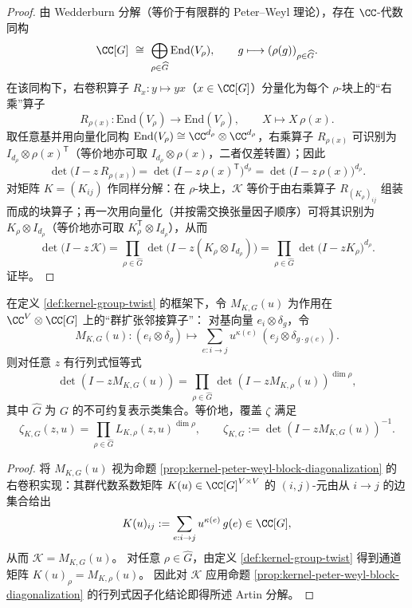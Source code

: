 \begin{proof}
由 Wedderburn 分解（等价于有限群的 Peter--Weyl 理论），存在 \(\CC\)-代数同构
\[
\CC[G]\ \cong\ \bigoplus_{\rho\in\widehat G}\mathrm{End}(V_\rho),
\qquad
g\longmapsto (\rho(g))_{\rho\in\widehat G}.
\]
在该同构下，右卷积算子 \(R_x:y\mapsto yx\)（\(x\in\CC[G]\)）分量化为每个 \(\rho\)-块上的“右乘”算子
\[
R_{\rho(x)}:\mathrm{End}(V_\rho)\to\mathrm{End}(V_\rho),\qquad X\longmapsto X\,\rho(x).
\]
取任意基并用向量化同构 \(\mathrm{End}(V_\rho)\cong \CC^{d_\rho}\otimes\CC^{d_\rho}\)，右乘算子 \(R_{\rho(x)}\) 可识别为 \(I_{d_\rho}\otimes \rho(x)^{\mathsf T}\)（等价地亦可取 \(I_{d_\rho}\otimes\rho(x)\)，二者仅差转置）；因此
\[
\det\!\bigl(I-z\,R_{\rho(x)}\bigr)
=\det\!\bigl(I-z\,\rho(x)^{\mathsf T}\bigr)^{d_\rho}
=\det\!\bigl(I-z\,\rho(x)\bigr)^{d_\rho}.
\]
对矩阵 \(K=(K_{ij})\) 作同样分解：在 \(\rho\)-块上，\(\mathcal{K}\) 等价于由右乘算子 \(R_{(K_\rho)_{ij}}\) 组装而成的块算子；再一次用向量化（并按需交换张量因子顺序）可将其识别为 \(K_\rho\otimes I_{d_\rho}\)（等价地亦可取 \(K_\rho^{\mathsf T}\otimes I_{d_\rho}\)），从而
\[
\det\!\bigl(I-z\,\mathcal{K}\bigr)
=\prod_{\rho\in\widehat G}\det\!\bigl(I-z(K_\rho\otimes I_{d_\rho})\bigr)
=\prod_{\rho\in\widehat G}\det\!\bigl(I-zK_\rho\bigr)^{d_\rho}.
\]
证毕。
\end{proof}

\begin{proposition}\label{prop:kernel-artin-factorization}
在定义 \ref{def:kernel-group-twist} 的框架下，令 $M_{K,G}(u)$ 为作用在 $\CC^{V}\otimes\CC[G]$ 上的“群扩张邻接算子”：
对基向量 $e_{i}\otimes\delta_g$，令
\[
M_{K,G}(u):(e_i\otimes\delta_g)\mapsto \sum_{e:i\to j}u^{\kappa(e)}\,(e_j\otimes \delta_{g\cdot g(e)}).
\]
则对任意 $z$ 有行列式恒等式
\[
\det(I-zM_{K,G}(u))=\prod_{\rho\in\widehat G}\det(I-zM_{K,\rho}(u))^{\dim\rho},
\]
其中 $\widehat G$ 为 $G$ 的不可约复表示类集合。等价地，覆盖 $\zeta$ 满足
\[
\zeta_{K,G}(z,u)=\prod_{\rho\in\widehat G}L_{K,\rho}(z,u)^{\dim\rho},
\qquad
\zeta_{K,G}:=\det(I-zM_{K,G}(u))^{-1}.
\]
\end{proposition}

\begin{proof}
将 $M_{K,G}(u)$ 视为命题 \ref{prop:kernel-peter-weyl-block-diagonalization} 的右卷积实现：其群代数系数矩阵 \(K(u)\in\CC[G]^{V\times V}\) 的 \((i,j)\)-元由从 \(i\to j\) 的边集合给出
\[
K(u)_{ij}:=\sum_{e:i\to j}u^{\kappa(e)}\,g(e)\in\CC[G],
\]
从而 \(\mathcal{K}=M_{K,G}(u)\)。
对任意 \(\rho\in\widehat G\)，由定义 \ref{def:kernel-group-twist} 得到通道矩阵
\(
K(u)_\rho=M_{K,\rho}(u)
\)。
因此对 \(\mathcal{K}\) 应用命题 \ref{prop:kernel-peter-weyl-block-diagonalization} 的行列式因子化结论即得所述 Artin 分解。
\end{proof}

